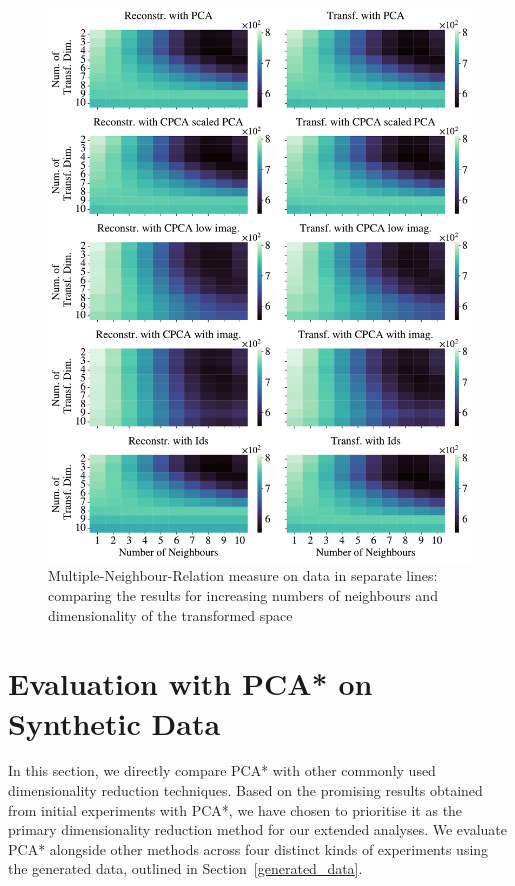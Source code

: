 \documentclass[pdftex,12pt,a4paper]{report}
\begin{document}
\begin{figure}
    \includegraphics[width = \textwidth]{images/multiple_runs/cpca/sep_lines/num_neigh_vs_dyn_low/multiple_scalar_product_10runs_5lines_100points_10neighbours.pdf}
    \caption{Multiple-Neighbour-Relation measure on data in separate lines: comparing the results for increasing numbers of neighbours and dimensionality of the transformed space}\label{fig:cpca-num_neigh_vs_dyn_low-seplines-mscal}
\end{figure}

\FloatBarrier

\section{Evaluation with PCA* on Synthetic Data} \label{sec:evaluation-synthetic}
In this section, we directly compare PCA* with other commonly used dimensionality reduction techniques.
Based on the promising results obtained from initial experiments with PCA*, we have chosen to prioritise it as the primary dimensionality reduction method for our extended analyses.
We evaluate PCA* alongside other methods across four distinct kinds of experiments using the generated data, outlined in Section~\ref{generated_data}.
\end{document}
